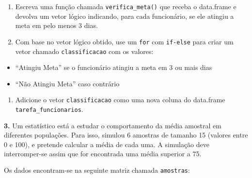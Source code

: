 \documentclass[
]{book}
\providecommand{\tightlist}{%
  \setlength{\itemsep}{0pt}\setlength{\parskip}{0pt}}
\begin{document}
\begin{enumerate}
\def\labelenumi{(\alph{enumi})}
\item
  Escreva uma função chamada \texttt{verifica\_meta()} que receba o data.frame e devolva um vetor lógico indicando, para cada funcionário, se ele atingiu a meta em pelo menos 3 dias.
\item
  Com base no vetor lógico obtido, use um \texttt{for} com \texttt{if-else} para criar um vetor chamado \texttt{classificacao} com os valores:
\end{enumerate}

\begin{itemize}
\tightlist
\item
  ``Atingiu Meta'' se o funcionário atingiu a meta em 3 ou mais dias
\item
  ``Não Atingiu Meta'' caso contrário
\end{itemize}

\begin{enumerate}
\def\labelenumi{(\alph{enumi})}
\setcounter{enumi}{2}
\tightlist
\item
  Adicione o vetor \texttt{classificacao} como uma nova coluna do data.frame \texttt{tarefa\_funcionarios}.
\end{enumerate}

\textbf{3.} Um estatístico está a estudar o comportamento da média amostral em diferentes populações. Para isso, simulou 6 amostras de tamanho 15 (valores entre 0 e 100), e pretende calcular a média de cada uma. A simulação deve interromper-se assim que for encontrada uma média superior a 75.

Os dados encontram-se na seguinte matriz chamada \texttt{amostras}:
\end{document}
